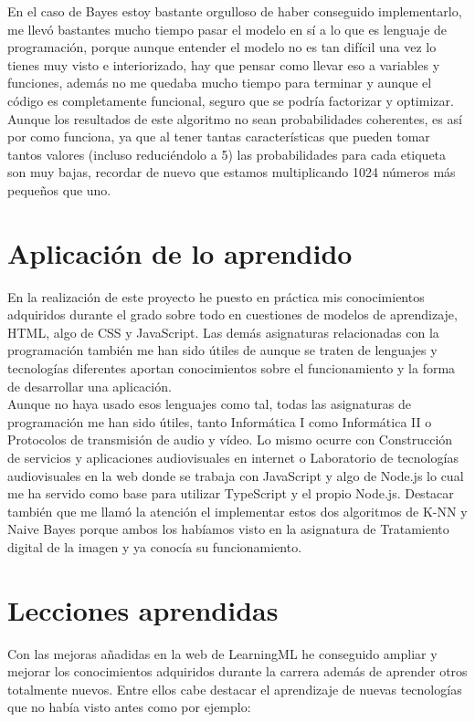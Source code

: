 \documentclass[a4paper, 12pt]{book}
\begin{document}
En el caso de Bayes estoy bastante orgulloso de haber conseguido implementarlo, me llevó bastantes mucho tiempo pasar el modelo en sí a lo que es lenguaje de programación, porque aunque entender el modelo no es tan difícil una vez lo tienes muy visto e interiorizado, hay que pensar como llevar eso a variables y funciones, además no me quedaba mucho tiempo para terminar y aunque el código es completamente funcional, seguro que se podría factorizar y optimizar. Aunque los resultados de este algoritmo no sean probabilidades coherentes, es así por como funciona, ya que al tener tantas características que pueden tomar tantos valores (incluso reduciéndolo a 5) las probabilidades para cada etiqueta son muy bajas, recordar de nuevo que estamos multiplicando 1024 números más pequeños que uno.


\section{Aplicación de lo aprendido}
\label{sec:aplicacion}

En la realización de este proyecto he puesto en práctica mis conocimientos adquiridos durante el grado sobre todo en cuestiones de modelos de aprendizaje, HTML, algo de CSS y JavaScript. Las demás asignaturas relacionadas con la programación también me han sido útiles de aunque se traten de lenguajes y tecnologías diferentes aportan conocimientos sobre el funcionamiento y la forma de desarrollar una aplicación.\\
Aunque no haya usado esos lenguajes como tal, todas las asignaturas de programación me han sido útiles, tanto Informática I como Informática II o Protocolos de transmisión de audio y vídeo. Lo mismo ocurre con Construcción de servicios y aplicaciones audiovisuales en internet o Laboratorio de tecnologías audiovisuales en la web donde se trabaja con JavaScript y algo de Node.js lo cual me ha servido como base para utilizar TypeScript y el propio Node.js.
Destacar también que me llamó la atención el implementar estos dos algoritmos de K-NN y Naive Bayes porque ambos los habíamos visto en la asignatura de Tratamiento digital de la imagen y ya conocía su funcionamiento.

\section{Lecciones aprendidas}
\label{sec:lecciones_aprendidas}

Con las mejoras añadidas en la web de LearningML he conseguido ampliar y mejorar los conocimientos adquiridos durante la carrera además de aprender otros totalmente nuevos. Entre ellos cabe destacar el aprendizaje de nuevas tecnologías que no había visto antes como por ejemplo:
\end{document}
